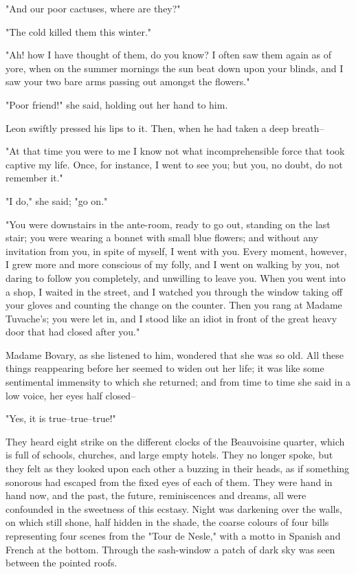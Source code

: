 \documentclass{tufte-book}
\begin{document}
"And our poor cactuses, where are they?"

"The cold killed them this winter."

"Ah! how I have thought of them, do you know? I often saw them again as
of yore, when on the summer mornings the sun beat down upon your blinds,
and I saw your two bare arms passing out amongst the flowers."

"Poor friend!" she said, holding out her hand to him.

Leon swiftly pressed his lips to it. Then, when he had taken a deep
breath--

"At that time you were to me I know not what incomprehensible force that
took captive my life. Once, for instance, I went to see you; but you, no
doubt, do not remember it."

"I do," she said; "go on."

"You were downstairs in the ante-room, ready to go out, standing on
the last stair; you were wearing a bonnet with small blue flowers; and
without any invitation from you, in spite of myself, I went with you.
Every moment, however, I grew more and more conscious of my folly, and
I went on walking by you, not daring to follow you completely, and
unwilling to leave you. When you went into a shop, I waited in the
street, and I watched you through the window taking off your gloves and
counting the change on the counter. Then you rang at Madame Tuvache's;
you were let in, and I stood like an idiot in front of the great heavy
door that had closed after you."

Madame Bovary, as she listened to him, wondered that she was so old. All
these things reappearing before her seemed to widen out her life; it was
like some sentimental immensity to which she returned; and from time to
time she said in a low voice, her eyes half closed--

"Yes, it is true--true--true!"

They heard eight strike on the different clocks of the Beauvoisine
quarter, which is full of schools, churches, and large empty hotels.
They no longer spoke, but they felt as they looked upon each other a
buzzing in their heads, as if something sonorous had escaped from the
fixed eyes of each of them. They were hand in hand now, and the past,
the future, reminiscences and dreams, all were confounded in the
sweetness of this ecstasy. Night was darkening over the walls, on which
still shone, half hidden in the shade, the coarse colours of four bills
representing four scenes from the "Tour de Nesle," with a motto in
Spanish and French at the bottom. Through the sash-window a patch of
dark sky was seen between the pointed roofs.
\end{document}
